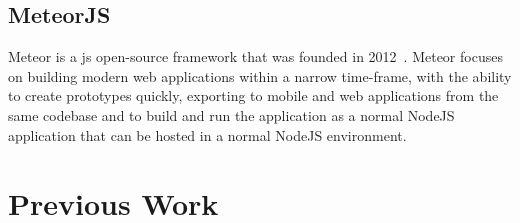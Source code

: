 \subsection{MeteorJS}
\label{sub:meteor}
Meteor is a \ac{js} open-source framework that was founded in 2012~\cite{meteor_launch}.
Meteor focuses on building modern web applications within a narrow time-frame, with the ability to create prototypes quickly, exporting to mobile
and web applications from the same codebase and to build and run the application as a normal NodeJS application that can be hosted in a normal
NodeJS environment.

\section{Previous Work}
\label{sec:previous-work}
